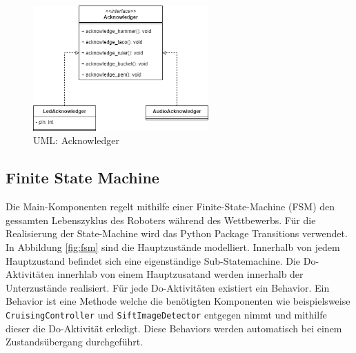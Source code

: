 \begin{figure}[H]
  \includegraphics[width=0.6\textwidth]{img/softwarearchitektur/UML-Acknowledger.png}
  \centering
  \caption{UML: Acknowledger}
  \label{fig:uml-acknowledger}
\end{figure}

\subsection{Finite State Machine}
\label{sec:fsm}
Die Main-Komponenten regelt mithilfe einer Finite-State-Machine (FSM) den gessamten Lebenszyklus des Roboters während des Wettbewerbs. Für die Realisierung der State-Machine wird das Python Package Transitions \cite{pytransitions} verwendet. In Abbildung \ref{fig:fsm} sind die Hauptzustände modelliert. Innerhalb von jedem Hauptzustand befindet sich eine eigenständige Sub-Statemachine. Die Do-Aktivitäten innerhlab von einem Hauptzusatand werden innerhalb der Unterzustände realisiert. Für jede Do-Aktivitäten existiert ein Behavior. Ein Behavior ist eine Methode welche die benötigten Komponenten wie beispielsweise \texttt{CruisingController} und \texttt{SiftImageDetector} entgegen nimmt und mithilfe dieser die Do-Aktivität erledigt. Diese Behaviors werden automatisch bei einem Zustandsübergang durchgeführt.

